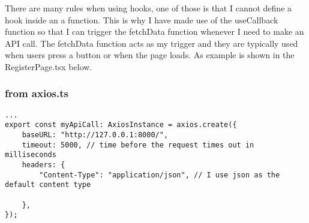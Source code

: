 There are many rules when using hooks, one of those is that I cannot define a hook inside an a function. This is why I have made use of the useCallback function so that I can trigger the fetchData function whenever I need to make an API call. The fetchData function acts as my trigger and they are typically used when users press a button or when the page loads. As example is shown in the RegisterPage.tsx below.

\subsubsection{from axios.ts}
\begin{verbatim}
...
export const myApiCall: AxiosInstance = axios.create({
    baseURL: "http://127.0.0.1:8000/", 
    timeout: 5000, // time before the request times out in milliseconds
    headers: {
        "Content-Type": "application/json", // I use json as the default content type 
        
    },
});
\end{verbatim}

